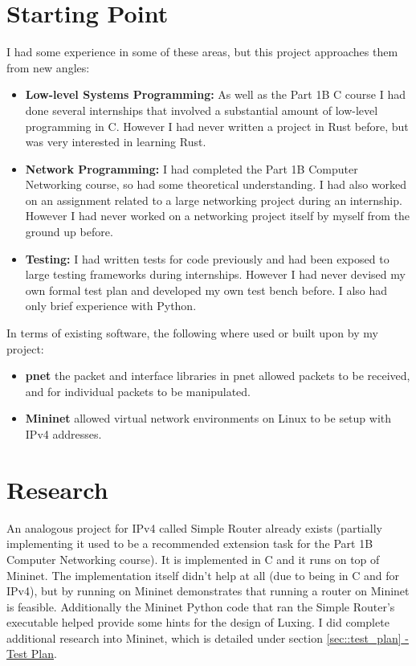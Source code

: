 \documentclass[12pt,a4paper,twoside,openany]{report}
\begin{document}
\section{Starting Point}
I had some experience in some of these areas, but this project approaches them from new angles:
\begin{itemize}
\item \textbf{Low-level Systems Programming:} As well as the Part 1B C course I had done several internships that involved a substantial amount of low-level programming in C. However I had never written a project in Rust before, but was very interested in learning Rust.
\item \textbf{Network Programming:} I had completed the Part 1B Computer Networking course, so had some theoretical understanding.  I had also worked on an assignment related to a large networking project during an internship.  However I had never worked on a networking project itself by myself from the ground up before.
\item \textbf{Testing:} I had written tests for code previously and had been exposed to large testing frameworks during internships.  However I had never devised my own formal test plan and developed my own test bench before. I also had only brief experience with Python.
\end{itemize}
In terms of existing software, the following where used or built upon by my project:
\begin{itemize}
\item \textbf{pnet}\cite{pnet_rust} the packet and interface libraries in pnet allowed packets to be received, and for individual packets to be manipulated.
\item \textbf{Mininet}\cite{mininet} allowed virtual network environments on Linux to be setup with IPv4 addresses.
\end{itemize}

\section{Research}
An analogous project for IPv4 called Simple Router already exists\cite{simple_router} (partially implementing it used to be a recommended extension task for the Part 1B Computer Networking course).  It is implemented in C and it runs on top of Mininet.  The implementation itself didn't help at all (due to being in C and for IPv4), but by running on Mininet demonstrates that running a router on Mininet is feasible.  Additionally the Mininet Python code that ran the Simple Router's executable helped provide some hints for the design of Luxing.  I did complete additional research into Mininet, which is detailed under section \ref{sec::test_plan}\hyperref[sec::test_plan]{ - Test Plan}.
\end{document}
